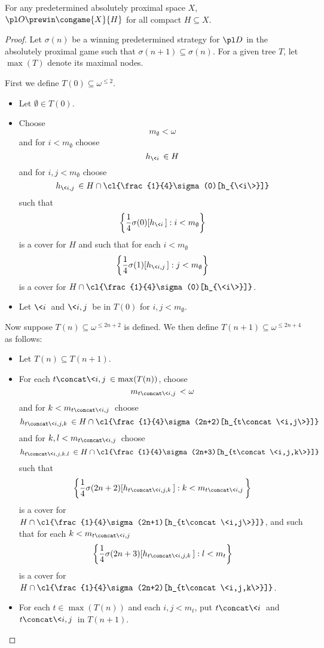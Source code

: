 \begin{thm}
  For any predetermined absolutely proximal space $X$, 
  $\pl O\prewin \congame{X}{H}$ for all compact $H\subseteq X$.
\end{thm}

\begin{proof}
  Let $\sigma(n)$ be a winning predetermined strategy for $\pl D$ in the 
  absolutely proximal game such that 
  $\sigma(n+1)\subseteq \sigma(n)$.
  For a given tree $T$, let $\max(T)$ denote its maximal nodes.

  \bigskip

  First we define $T(0)\subseteq \omega^{\leq 2}$.

  \begin{itemize}
    \item Let $\emptyset\in T(0)$.
    \item Choose 
      \[
        m_{\emptyset}<\omega
      \]
      and for $i<m_{\emptyset}$ choose
      \[
        h_{\<i\>}\in H
      \]
      and for $i,j<m_{\emptyset}$ choose
      \[
        h_{\<i,j\>}
          \in 
        H\cap\cl{\frac{1}{4}\sigma(0)[h_{\<i\>}]}
      \]
      such that
        \[
          \left\{\frac{1}{4}\sigma(0)[h_{\<i\>}]:i<m_{\emptyset}\right\}
        \]
      is a cover for $H$ and such that for each $i<m_{\emptyset}$
        \[
          \left\{\frac{1}{4}\sigma(1)[h_{\<i,j\>}]:j<m_{\emptyset}\right\}
        \]
      is a cover for 
      $H\cap\cl{\frac{1}{4}\sigma(0)[h_{\<i\>}]}$.
    \item Let $\<i\>$ and $\<i,j\>$ be in $T(0)$ for $i,j<m_{\emptyset}$.
  \end{itemize}

  \bigskip

  Now suppose $T(n)\subseteq \omega^{\leq 2n+2}$ is defined. 
  We then define $T(n+1)\subseteq \omega^{\leq 2n+4}$ as follows:

  \begin{itemize}
    \item Let $T(n)\subseteq T(n+1)$.
    \item For each $t\concat\<i,j\>\in\max(T(n))$, choose 
        \[m_{t\concat\<i,j\>}<\omega\]
        and for $k<m_{t\concat\<i,j\>}$ choose 
          \[
            h_{t\concat\<i,j,k\>}
              \in 
            H\cap \cl{\frac{1}{4}\sigma(2n+2)[h_{t\concat\<i,j\>}]}
          \]
        and for $k,l<m_{t\concat\<i,j\>}$ choose
          \[
            h_{t\concat\<i,j,k,l\>} 
              \in 
            H\cap\cl{\frac{1}{4}\sigma(2n+3)[h_{t\concat\<i,j,k\>}]}
          \]
        such that
      \[
        \left\{\frac{1}{4}\sigma(2n+2)[h_{t\concat\<i,j,k\>}]
          :
        k<m_{t\concat\<i,j\>}\right\}
      \]
    is a cover for $H\cap \cl{\frac{1}{4}\sigma(2n+1)[h_{t\concat\<i,j\>}]}$, 
    and such that for each $k<m_{t\concat\<i,j\>}$
      \[
        \left\{\frac{1}{4}\sigma(2n+3)[h_{t\concat\<i,j,k\>}]:l<m_t\right\}
      \]
    is a cover for $H\cap\cl{\frac{1}{4}\sigma(2n+2)[h_{t\concat\<i,j,k\>}]}$.
    \item For each $t\in\max(T(n))$ and each $i,j<m_t$, put $t\concat\<i\>$
      and $t\concat\<i,j\>$ in $T(n+1)$.
  \end{itemize}


\end{proof}
